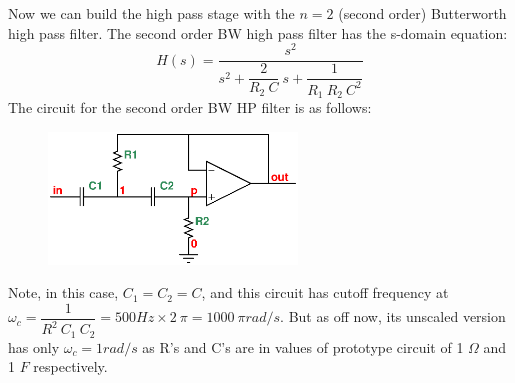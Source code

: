 \documentclass[report]{IEEEtran}
\newcommand{\inv}[1]{\dfrac{1}{#1}}
\begin{document}
				Now we can build the high pass stage with the $n=2$ (second order) Butterworth high pass filter. The second order BW high pass filter has the s-domain equation:
				\begin{equation}
					\label{spec:bw:hp:n2}
					H(s)=\dfrac{s^2}{s^2+\dfrac{2}{R_2~C}~s+\inv{R_1~R_2~C^2}}
				\end{equation}
				The circuit for the second order BW HP filter is as follows:
				\begin{figure}[h!]
					\begin{center}
						\includegraphics[width=250px]{hp.eps}
					\end{center}
				\end{figure}
				
				Note, in this case, $C_1=C_2=C$, and this circuit has cutoff frequency at $\omega_c = \inv{R^2~C_1~C_2} = 500 Hz \times 2~\pi = 1000~\pi rad/s$. But as off now, its unscaled version has only $\omega_c = 1 rad/s$ as R's and C's are in values of prototype circuit of 1 $\Omega$ and 1 $F$ respectively.
				
\end{document}
